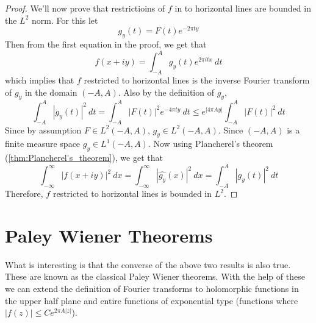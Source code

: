 \begin{proof}
  We'll now prove that restrictioins of $f$ in to horizontal lines are bounded in the $L^2$ norm. For this let $$g_y(t) = F(t)e^{-2\pi ty}$$
  Then from the first equation in the proof, we get that $$f(x+iy) = \int_{-A}^A g_y(t) e^{2\pi itx} \ dt$$
which implies that $f$ restricted to horizontal lines is the inverse Fourier transform of $g_y$ in the domain $(-A, A)$. Also by the definition of $g_y$, $$\int_{-A}^A \left|g_y(t)\right|^2 \ dt = \int_{-A}^A \left|F(t)\right|^2 e^{-4\pi t y} \ dt \le e^{\left|4\pi Ay\right|}\int_{-A}^A \left|F(t)\right|^2 \ dt$$
  Since by assumption $F \in L^2(-A, A)$, $g_y \in L^2(-A, A)$. Since $(-A, A)$ is a finite measure space $g_y \in L^1(-A, A)$. Now using Plancherel's theorem (\autoref{thm:Plancherel's_theorem}), we get that $$\int_{-\infty}^\infty |f(x+iy)|^2 \ dx = \int_{-\infty}^\infty |\widehat{g_y}(x)|^2 \ dx = \int_{-A}^A |g_y(t)|^2 \ dt $$
  Therefore, $f$ restricted to horizontal lines is bounded in $L^2$.
\end{proof}

\section{Paley Wiener Theorems}
What is interesting is that the converse of the above two results is also true. These are known as the classical Paley Wiener theorems. With the help of these we can extend the definition of Fourier transforms to holomorphic functions in the upper half plane and entire functions of exponential type (functions where $|f(z)| \le Ce^{2\pi A |z|}$).


